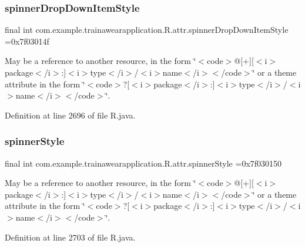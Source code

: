 \subsubsection{\texorpdfstring{spinnerDropDownItemStyle}{spinnerDropDownItemStyle}}
{\footnotesize\ttfamily final int com.\+example.\+trainawearapplication.\+R.\+attr.\+spinner\+Drop\+Down\+Item\+Style =0x7f03014f\hspace{0.3cm}{\ttfamily [static]}}

May be a reference to another resource, in the form \char`\"{}$<$code$>$@\mbox{[}+\mbox{]}\mbox{[}$<$i$>$package$<$/i$>$\+:\mbox{]}$<$i$>$type$<$/i$>$/$<$i$>$name$<$/i$>$$<$/code$>$\char`\"{} or a theme attribute in the form \char`\"{}$<$code$>$?\mbox{[}$<$i$>$package$<$/i$>$\+:\mbox{]}$<$i$>$type$<$/i$>$/$<$i$>$name$<$/i$>$$<$/code$>$\char`\"{}. 

Definition at line 2696 of file R.\+java.

\mbox{\label{classcom_1_1example_1_1trainawearapplication_1_1_r_1_1attr_a2ca6d39b9e2f4152353d2d8038e771f8}} 
\subsubsection{\texorpdfstring{spinnerStyle}{spinnerStyle}}
{\footnotesize\ttfamily final int com.\+example.\+trainawearapplication.\+R.\+attr.\+spinner\+Style =0x7f030150\hspace{0.3cm}{\ttfamily [static]}}

May be a reference to another resource, in the form \char`\"{}$<$code$>$@\mbox{[}+\mbox{]}\mbox{[}$<$i$>$package$<$/i$>$\+:\mbox{]}$<$i$>$type$<$/i$>$/$<$i$>$name$<$/i$>$$<$/code$>$\char`\"{} or a theme attribute in the form \char`\"{}$<$code$>$?\mbox{[}$<$i$>$package$<$/i$>$\+:\mbox{]}$<$i$>$type$<$/i$>$/$<$i$>$name$<$/i$>$$<$/code$>$\char`\"{}. 

Definition at line 2703 of file R.\+java.

\mbox{\label{classcom_1_1example_1_1trainawearapplication_1_1_r_1_1attr_a2612dc2dd334b1f025ccc53a49b8c037}} 
